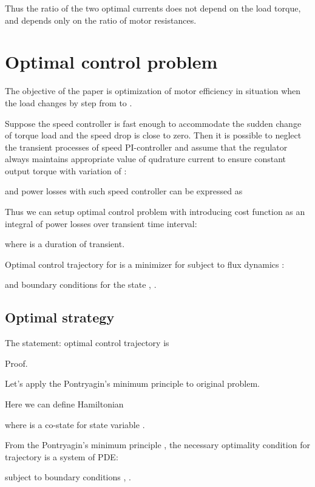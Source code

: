 \documentclass[journal]{IEEEtran}
\begin{document}
Thus the ratio of the two optimal currents  does not depend on the load torque, and depends only on the ratio of motor resistances.

\section{Optimal control problem}

The objective of the paper is optimization of motor efficiency in situation when the load changes by step from  to .

Suppose the speed controller is fast enough to accommodate the sudden change of torque load and the speed drop is close to zero. Then it is possible to neglect the transient processes of speed PI-controller and assume that the regulator always maintains appropriate value of qudrature current to ensure constant output torque with variation of :



and power losses with such speed controller can be expressed as



Thus we can setup optimal control problem with introducing cost function as an integral of power losses over transient time interval: 



where  is a duration of transient.

Optimal control trajectory for  is a minimizer for  subject to flux dynamics :



and boundary conditions for the state , .

\subsection{Optimal strategy}

The statement: optimal control trajectory is 



Proof.

Let's apply the Pontryagin's minimum principle to original problem.

Here we can define Hamiltonian



where  is a co-state for state variable .

From the Pontryagin's minimum principle \cite{9}, the necessary optimality condition for trajectory  is a system of PDE:



subject to boundary conditions , . 
\end{document}
